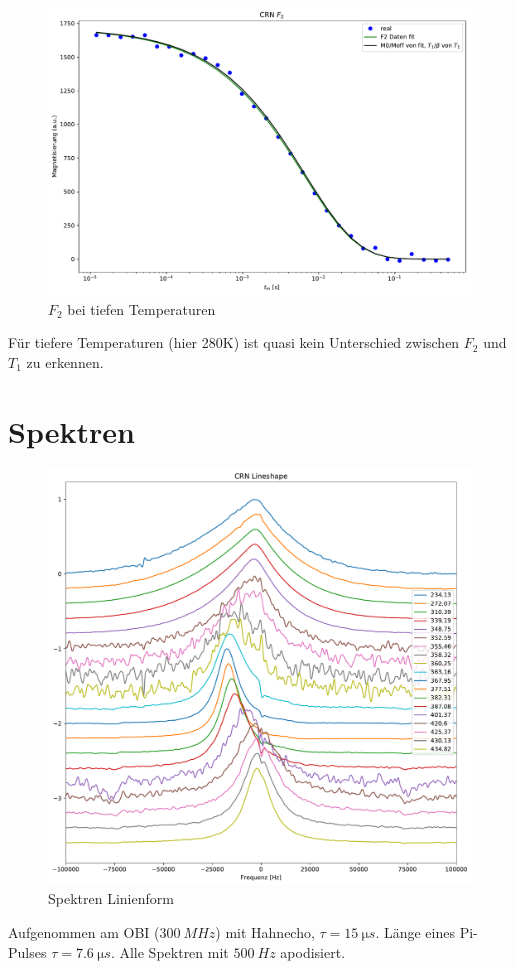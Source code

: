 \begin{figure}
	\begin{center}
		\includegraphics[width=\textwidth]{graphics/plots/F2/f2_tieftemp.pdf}
	\end{center}
	\caption{$F_2$ bei tiefen Temperaturen} \label{fig:res:F_2_tieftemp}
\end{figure}
Für tiefere Temperaturen (hier 280K) ist quasi kein Unterschied zwischen $F_2$ und $T_1$ zu erkennen.


\section{Spektren} \label{section:res:spektren}

\begin{figure}
	\begin{center}
		\includegraphics[width=\textwidth]{graphics/plots/SPEK/spek_lineshape.pdf}
	\end{center}
	\caption{Spektren Linienform} \label{fig:res:spek_linienform}
\end{figure}
Aufgenommen am OBI ($\SI{300}{MHz}$) mit Hahnecho, $\tau = \SI{15}{\micro s}$. Länge eines Pi-Pulses $\tau = \SI{7.6}{\micro s}$. Alle Spektren mit $\SI{500}{Hz}$ apodisiert.

